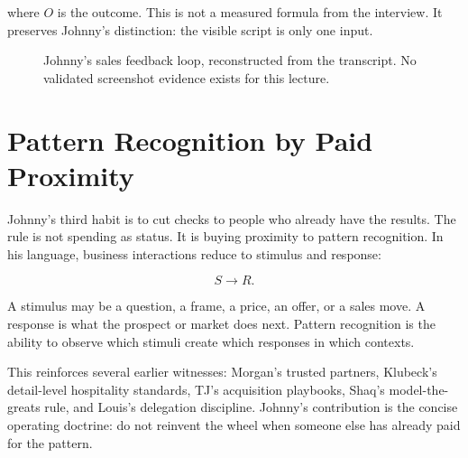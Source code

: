 \documentclass[11pt,oneside]{book}
\begin{document}
where \(O\) is the outcome. This is not a measured formula from the interview. It preserves Johnny's distinction: the visible script is only one input.

\begin{figure}
\centering
{}
\caption{Johnny's sales feedback loop, reconstructed from the transcript. No validated screenshot evidence exists for this lecture.}
\end{figure}

\section{Pattern Recognition by Paid Proximity}

Johnny's third habit is to cut checks to people who already have the results. The rule is not spending as status. It is buying proximity to pattern recognition. In his language, business interactions reduce to stimulus and response:

\begin{equation}
S \longrightarrow R.
\end{equation}

A stimulus may be a question, a frame, a price, an offer, or a sales move. A response is what the prospect or market does next. Pattern recognition is the ability to observe which stimuli create which responses in which contexts.

This reinforces several earlier witnesses: Morgan's trusted partners, Klubeck's detail-level hospitality standards, TJ's acquisition playbooks, Shaq's model-the-greats rule, and Louis's delegation discipline. Johnny's contribution is the concise operating doctrine: do not reinvent the wheel when someone else has already paid for the pattern.
\end{document}
